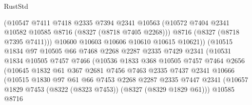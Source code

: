 \begin{lexlean}{RustStd}
\begin{coremodule}
{\begin{coremodule}
{{{{{{{{{{{{{{{{{{{{{{{{{{{{{{{{{{{{{{{{{{{{{{{{{{{{{{                            (@10547
                              @7411
                              @7418
                              @2335
                              @7394
                              @2341
                              @10563
                              (@10572 @7404 @2341 @10582 @10585 @8716 (@8327 (@8718 @7405 @2268)))
                              @8716
                              (@8327 (@8718 @7395 @7411)))
                            @10600
                            @10603
                            @10606
                            @10610
                            @10615
                            @10621))
                        (@10515
                          @1834
                          @97
                          @10505
                          @66
                          @7468
                          @2268
                          @2287
                          @2335
                          @7429
                          @2341
                          (@10531
                            @1834
                            @10505
                            @7457
                            @7466
                            (@10536
                              @1833
                              @368
                              @10505
                              @7457
                              @7464
                              @2656
                              (@10645
                                @1832
                                @61
                                @367
                                @2681
                                @7456
                                @7463
                                @2335
                                @7437
                                @2341
                                @10666
                                (@10515
                                  @1830
                                  @97
                                  @61
                                  @66
                                  @7453
                                  @2268
                                  @2287
                                  @2335
                                  @7447
                                  @2341
                                  (@10657
                                    @1829
                                    @7453
                                    (@8322 (@8323 @7453))
                                    (@8327 (@8329 @1829 @61)))
                                  @10585
                                  @8716
}}}}}}}}}}}}}}}}}}}}}}}}}}}}}}}}}}}}}}}}}}}}}}}}}}}}}}
\end{coremodule}}
\end{coremodule}
\end{lexlean}
